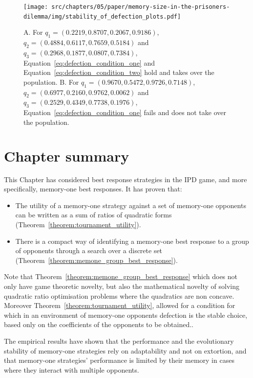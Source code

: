 \begin{figure}[!htbp]
    \centering
    \texttt{[image: src/chapters/05/paper/memory-size-in-the-prisoners-dilemma/img/stability\_of\_defection\_plots.pdf]}
    \caption{A. For \(q_{1}=(0.2219, 0.8707, 0.2067, 0.9186)\),
    $q_{2}=(0.4884, 0.6117, 0.7659, 0.5184)$ and
    $q_{3}=(0.2968, 0.1877, 0.0807, 0.7384)$, Equation~\ref{eq:defection_condition_one} and
    Equation~\ref{eq:defection_condition_two} hold and \Defector takes over the
    population. \protect\linebreak
    B. For $q_{1}=(0.9670, 0.5472, 0.9726, 0.7148)$,
    $q_{2}=(0.6977, 0.2160, 0.9762, 0.0062)$ and
    $q_{3}=(0.2529, 0.4349, 0.7738, 0.1976)$, Equation~\ref{eq:defection_condition_one} fails
    and \Defector does not take over the population.}\label{fig:stability_of_defection}
\end{figure}

\section{Chapter summary}

This Chapter has considered best response strategies in the IPD
game, and more specifically, memory-one best responses. It has proven that:

\begin{itemize}
    \item The utility of a memory-one strategy against a set
          of memory-one opponents can be written as a sum of ratios of quadratic
          forms (Theorem~\ref{theorem:tournament_utility}).
    \item There is a compact way of identifying a memory-one best response to a
        group of opponents through a search over a discrete set
        (Theorem~\ref{theorem:memone_group_best_response}).
\end{itemize}

Note that Theorem~\ref{theorem:memone_group_best_response} which does not only
have game theoretic novelty, but also the mathematical novelty of solving
quadratic ratio optimisation problems where the quadratics are non concave.
Moreover Theorem~\ref{theorem:tournament_utility}, allowed for a
condition for which in an environment of memory-one opponents defection is the
stable choice, based only on the coefficients of the opponents to be obtained..

The empirical results have shown that the performance and the evolutionary
stability of memory-one strategies rely on adaptability and not on extortion,
and that memory-one strategies' performance is limited by their memory in cases
where they interact with multiple opponents.

